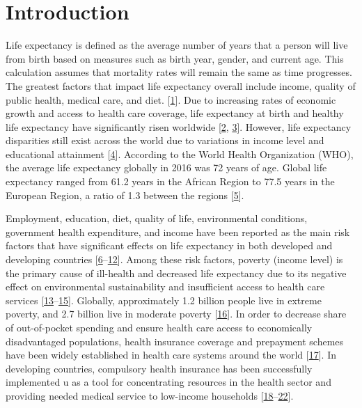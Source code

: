 \documentclass[]{elsarticle} %
\begin{document}
\begin{frontmatter}
 \end{frontmatter}

\newcommand{\blandscape}{\begin{landscape}}
\newcommand{\elandscape}{\end{landscape}}
\doublespacing

\hypertarget{introduction}{%
\section{Introduction}\label{introduction}}

Life expectancy is defined as the average number of years that a person will live from birth based on measures such as birth year, gender, and current age. This calculation assumes that mortality rates will remain the same as time progresses. The greatest factors that impact life expectancy overall include income, quality of public health, medical care, and diet. {[}\protect\hyperlink{ref-Statista}{1}{]}.
Due to increasing rates of economic growth and access to health care coverage, life expectancy at birth and healthy life expectancy have significantly risen worldwide {[}\protect\hyperlink{ref-bor2013increases}{2}, \protect\hyperlink{ref-mathers2015causes}{3}{]}.
However, life expectancy disparities still exist across the world due to variations in income level and educational attainment {[}\protect\hyperlink{ref-world2018global}{4}{]}.
According to the World Health Organization (WHO), the average life expectancy globally in 2016 was 72 years of age. Global life expectancy ranged from 61.2 years in the African Region to 77.5 years in the European Region, a ratio of 1.3 between the regions {[}\protect\hyperlink{ref-WHOobserve}{5}{]}.

Employment, education, diet, quality of life, environmental conditions, government health expenditure, and income have been reported as the main risk factors that have significant effects on life expectancy in both developed and developing countries {[}\protect\hyperlink{ref-assari2018life}{6}--\protect\hyperlink{ref-wilkinson2018impact}{12}{]}.
Among these risk factors, poverty (income level) is the primary cause of ill-health and decreased life expectancy due to its negative effect on environmental sustainability and insufficient access to health care services {[}\protect\hyperlink{ref-world2001dying}{13}--\protect\hyperlink{ref-rehm2018drinking}{15}{]}.
Globally, approximately 1.2 billion people live in extreme poverty, and 2.7 billion live in moderate poverty {[}\protect\hyperlink{ref-olinto2013state}{16}{]}.
In order to decrease share of out-of-pocket spending and ensure health care access to economically disadvantaged populations, health insurance coverage and prepayment schemes have been widely established in health care systems around the world {[}\protect\hyperlink{ref-wagstaff2018progress}{17}{]}.
In developing countries, compulsory health insurance has been successfully implemented u as a tool for concentrating resources in the health sector and providing needed medical service to low-income households {[}\protect\hyperlink{ref-abel1992health}{18}--\protect\hyperlink{ref-meng2015consolidating}{22}{]}.
\end{document}
